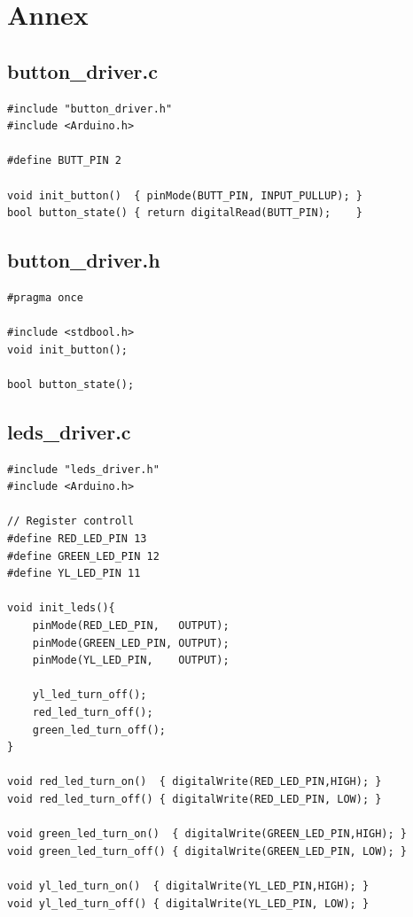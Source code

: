 \documentclass[12pt,a4paper]{article}
\begin{document}
\newpage
\section{Annex}

\subsection{ button\_driver.c }
\begin{lstlisting}
#include "button_driver.h"
#include <Arduino.h>

#define BUTT_PIN 2

void init_button()  { pinMode(BUTT_PIN, INPUT_PULLUP); }
bool button_state() { return digitalRead(BUTT_PIN);    }
\end{lstlisting}

\subsection{button\_driver.h}
\begin{lstlisting}
#pragma once

#include <stdbool.h>
void init_button();

bool button_state();
\end{lstlisting}

\subsection{leds\_driver.c}
\begin{lstlisting}
#include "leds_driver.h"
#include <Arduino.h>

// Register controll
#define RED_LED_PIN 13
#define GREEN_LED_PIN 12
#define YL_LED_PIN 11

void init_leds(){
	pinMode(RED_LED_PIN,   OUTPUT);
	pinMode(GREEN_LED_PIN, OUTPUT);
	pinMode(YL_LED_PIN,    OUTPUT);

	yl_led_turn_off();
	red_led_turn_off();
	green_led_turn_off();
}

void red_led_turn_on()  { digitalWrite(RED_LED_PIN,HIGH); }
void red_led_turn_off() { digitalWrite(RED_LED_PIN, LOW); }

void green_led_turn_on()  { digitalWrite(GREEN_LED_PIN,HIGH); }
void green_led_turn_off() { digitalWrite(GREEN_LED_PIN, LOW); }

void yl_led_turn_on()  { digitalWrite(YL_LED_PIN,HIGH); }
void yl_led_turn_off() { digitalWrite(YL_LED_PIN, LOW); }

\end{lstlisting}
\end{document}
